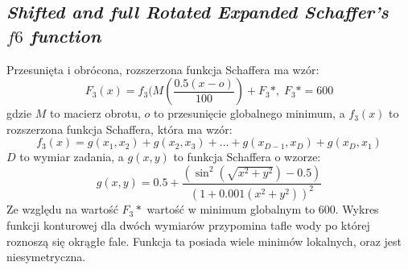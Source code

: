 \documentclass[10pt]{article}
\begin{document}
\subsection{\textit{Shifted and full Rotated Expanded Schaffer's $f6$ function}}
Przesunięta i obrócona, rozszerzona funkcja Schaffera ma wzór:
$$F_3(x) = f_3(M(\frac{0.5(x-o)}{100}) + F_3*, \; F_3* = 600$$
gdzie $M$ to macierz obrotu, $o$ to przesunięcie globalnego minimum, a $f_3(x)$ to rozszerzona funkcja Schaffera, która ma wzór:
$$f_3(x) = g(x_1,x_2)+ g(x_2,x_3) + \dots + g(x_{D-1},x_D) + g(x_D,x_1)$$
$D$ to wymiar zadania, a $g(x,y)$ to funkcja Schaffera o wzorze:
$$g(x,y) = 0.5 + \frac{(\sin^2(\sqrt{x^2 + y^2})-0.5)}{(1+0.001(x^2+y^2))^2}$$
Ze względu na wartość $F_3*$ wartość w minimum globalnym to 600. Wykres funkcji konturowej dla dwóch wymiarów przypomina tafle wody po której roznoszą się okrągłe fale. Funkcja ta posiada wiele minimów lokalnych, oraz jest niesymetryczna.
\end{document}
